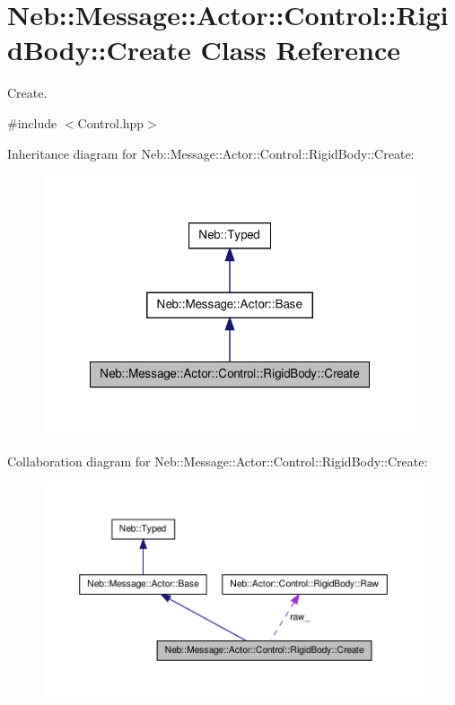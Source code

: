 \hypertarget{classNeb_1_1Message_1_1Actor_1_1Control_1_1RigidBody_1_1Create}{\section{\-Neb\-:\-:\-Message\-:\-:\-Actor\-:\-:\-Control\-:\-:\-Rigid\-Body\-:\-:\-Create \-Class \-Reference}
\label{classNeb_1_1Message_1_1Actor_1_1Control_1_1RigidBody_1_1Create}
}


\-Create.  




{\ttfamily \#include $<$\-Control.\-hpp$>$}



\-Inheritance diagram for \-Neb\-:\-:\-Message\-:\-:\-Actor\-:\-:\-Control\-:\-:\-Rigid\-Body\-:\-:\-Create\-:\nopagebreak
\begin{figure}[H]
\begin{center}
\leavevmode
\includegraphics[width=312pt]{classNeb_1_1Message_1_1Actor_1_1Control_1_1RigidBody_1_1Create__inherit__graph}
\end{center}
\end{figure}


\-Collaboration diagram for \-Neb\-:\-:\-Message\-:\-:\-Actor\-:\-:\-Control\-:\-:\-Rigid\-Body\-:\-:\-Create\-:\nopagebreak
\begin{figure}[H]
\begin{center}
\leavevmode
\includegraphics[width=350pt]{classNeb_1_1Message_1_1Actor_1_1Control_1_1RigidBody_1_1Create__coll__graph}
\end{center}
\end{figure}
